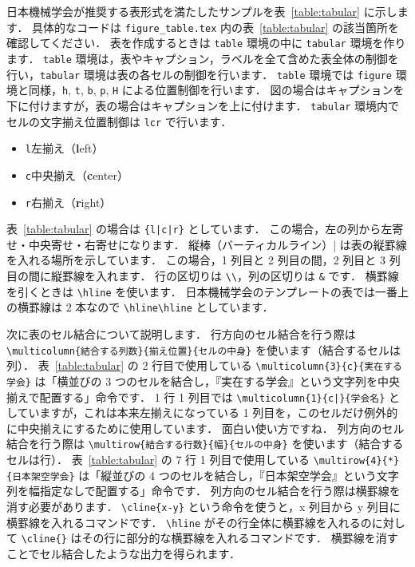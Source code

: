 日本機械学会が推奨する表形式を満たしたサンプルを表~\ref{table:tabular} に示します．
具体的なコードは \verb|figure_table.tex| 内の表~\ref{table:tabular} の該当箇所を確認してください．
表を作成するときは \verb|table| 環境の中に \verb|tabular| 環境を作ります．
\verb|table| 環境は，表やキャプション，ラベルを全て含めた表全体の制御を行い，\verb|tabular| 環境は表の各セルの制御を行います．
\verb|table| 環境では \verb|figure| 環境と同様，\verb|h|, \verb|t|, \verb|b|, \verb|p|, \verb|H| による位置制御を行います．
図の場合はキャプションを下に付けますが，表の場合はキャプションを上に付けます．
\verb|tabular| 環境内でセルの文字揃え位置制御は \verb|lcr| で行います．

\begin{itemize}
    \item \verb|l|\quad 左揃え（\textbf{l}eft）
    \item \verb|c|\quad 中央揃え（\textbf{c}enter）
    \item \verb|r|\quad 右揃え（\textbf{r}ight）
\end{itemize}

表~\ref{table:tabular} の場合は \texttt{\{l|c|r\}} としています．
この場合，左の列から左寄せ・中央寄せ・右寄せになります．
縦棒（バーティカルライン）\verb||| は表の縦罫線を入れる場所を示しています．
この場合，1 列目と 2 列目の間，2 列目と 3 列目の間に縦罫線を入れます．
行の区切りは \verb|\\|，列の区切りは \verb|&| です．
横罫線を引くときは \verb|\hline| を使います．
日本機械学会のテンプレートの表では一番上の横罫線は 2 本なので \verb|\hline\hline| としています．

次に表のセル結合について説明します．
行方向のセル結合を行う際は \verb|\multicolumn{結合する列数}{揃え位置}{セルの中身}| を使います（結合するセルは列）．
表~\ref{table:tabular} の 2 行目で使用している \verb|\multicolumn{3}{c}{実在する学会}| は「横並びの 3 つのセルを結合し，『実在する学会』という文字列を中央揃えで配置する」命令です．
1 行 1 列目では \texttt{\textbackslash multicolumn\{1\}\{c|\}\{学会名\}} としていますが，これは本来左揃えになっている 1 列目を，このセルだけ例外的に中央揃えにするために使用しています．
面白い使い方ですね．
列方向のセル結合を行う際は \verb|\multirow{結合する行数}{幅}{セルの中身}| を使います（結合するセルは行）．
表~\ref{table:tabular} の 7 行 1 列目で使用している \verb|\multirow{4}{*}{日本架空学会}| は「縦並びの 4 つのセルを結合し，『日本架空学会』という文字列を幅指定なしで配置する」命令です．
列方向のセル結合を行う際は横罫線を消す必要があります．
\verb|\cline{x-y}| という命令を使うと，x 列目から y 列目に横罫線を入れるコマンドです．
\verb|\hline| がその行全体に横罫線を入れるのに対して \verb|\cline{}| はその行に部分的な横罫線を入れるコマンドです．
横罫線を消すことでセル結合したような出力を得られます．

